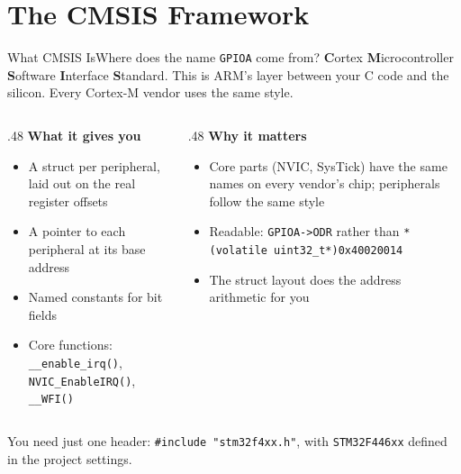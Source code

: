 \documentclass[9pt,aspectratio=169,xcolor=table]{beamer}
\begin{document}
\section{The CMSIS Framework}

\begin{frame}{What CMSIS Is}{Where does the name \texttt{GPIOA} come from?}
    \leavevmode
    { \textbf{C}ortex \textbf{M}icrocontroller \textbf{S}oftware
    \textbf{I}nterface \textbf{S}tandard. This is ARM's layer between
    your C code and the silicon. Every Cortex-M vendor uses
    the same style.}

    \vspace{3mm}
    \begin{columns}[T]
    \begin{column}{.48\textwidth}
        \textbf{What it gives you}
        {\small
        \begin{itemize}\itemsep1pt
            \item A \alert{struct} per peripheral, laid out on the real register
                  offsets
            \item A \alert{pointer} to each peripheral at its base address
            \item Named constants for bit fields
            \item Core functions: \texttt{\_\_enable\_irq()},
                  \texttt{NVIC\_EnableIRQ()}, \texttt{\_\_WFI()}
        \end{itemize}}
    \end{column}
    \begin{column}{.48\textwidth}
        \textbf{Why it matters}
        {\small
        \begin{itemize}\itemsep1pt
            \item Core parts (NVIC, SysTick) have the \alert{same names} on every vendor's chip; peripherals follow the same style
            \item Readable: \texttt{GPIOA->ODR} rather than
                  \texttt{*(volatile uint32\_t*)0x40020014}
            \item The struct layout does the address arithmetic for you
        \end{itemize}}
    \end{column}
    \end{columns}

    \vspace{2mm}
    {\small You need just one header: \texttt{\#include "stm32f4xx.h"}, with \texttt{STM32F446xx} defined in the project settings.}
\end{frame}
\end{document}
